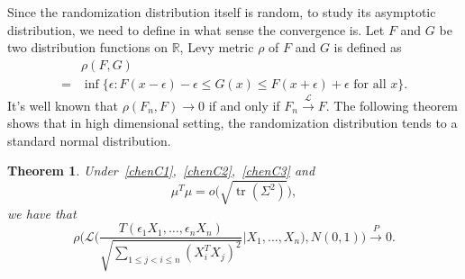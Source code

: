 \documentclass[review]{elsarticle}
\DeclareMathOperator{\mytr}{tr}
\theoremstyle{plain}
\newtheorem{theorem}{\quad\quad Theorem}
\theoremstyle{definition}
\theoremstyle{remark}
\begin{document}
Since the randomization distribution itself is random, to study its asymptotic distribution, we need to define in what sense the convergence is. Let $F$ and $G$ be two distribution functions on $\mathbb{R}$, Levy metric $\rho$ of $F$ and $G$ is defined as
    \begin{equation*}
    \begin{aligned}
        &\rho(F,G)\\
        =&\inf\{\epsilon:F(x-\epsilon)-\epsilon\leq G(x)\leq F(x+\epsilon)+\epsilon  \textrm{ for all } x\}.
    \end{aligned}
    \end{equation*}
It's well known that $\rho(F_n,F)\to 0$ if and only if  $F_n\xrightarrow{\mathcal{L}}F$.
The following theorem shows that in high dimensional setting, the randomization distribution tends to a standard normal distribution.


\begin{theorem}\label{shaziCLT}
    Under~\eqref{chenC1},~\eqref{chenC2},~\eqref{chenC3} and 
    \begin{equation}\label{mu2}
        \mu^T\mu=o\big(\sqrt{\mytr ({\Sigma}^2)}\big),
    \end{equation}
    we have that
    \begin{equation*}
            \rho\bigg(\mathcal{L}\bigg(\frac{T(\epsilon_1 X_1,\ldots,\epsilon_n X_n)}{\sqrt{\sum_{1\leq j<i\leq n}{(X_i^T X_j)}^2}}\bigg|X_1,\ldots,X_n\bigg),N(0,1)\bigg)
            \xrightarrow{P} 0.
    \end{equation*}
\end{theorem}
\end{document}
